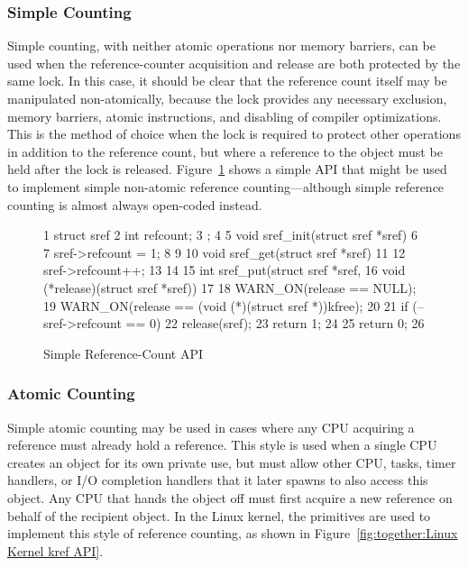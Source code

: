 \subsubsection{Simple Counting}
\label{sec:together:Simple Counting}

Simple counting, with neither atomic operations nor memory barriers,
can be used when the reference-counter acquisition and release are
both protected by the same lock.
In this case, it should be clear that the reference count itself
may be manipulated non-atomically, because the lock provides any
necessary exclusion, memory barriers, atomic instructions, and disabling
of compiler optimizations.
This is the method of choice when the lock is required to protect
other operations in addition to the reference count, but where
a reference to the object must be held after the lock is released.
Figure~\ref{fig:together:Simple Reference-Count API} shows a simple
API that might be used to implement simple non-atomic reference
counting---although simple reference counting is almost always
open-coded instead.

\begin{figure}[tbp]
{ \scriptsize
\begin{verbbox}
  1 struct sref {
  2   int refcount;
  3 };
  4
  5 void sref_init(struct sref *sref)
  6 {
  7   sref->refcount = 1;
  8 }
  9
 10 void sref_get(struct sref *sref)
 11 {
 12   sref->refcount++;
 13 }
 14
 15 int sref_put(struct sref *sref,
 16              void (*release)(struct sref *sref))
 17 {
 18   WARN_ON(release == NULL);
 19   WARN_ON(release == (void (*)(struct sref *))kfree);
 20
 21   if (--sref->refcount == 0) {
 22     release(sref);
 23     return 1;
 24   }
 25   return 0;
 26 }
\end{verbbox}
}
\centering
\theverbbox
\caption{Simple Reference-Count API}
\label{fig:together:Simple Reference-Count API}
\end{figure}

\subsubsection{Atomic Counting}
\label{sec:together:Atomic Counting}

Simple atomic counting may be used in cases where any CPU acquiring
a reference must already hold a reference.
This style is used when a single CPU creates an object for its
own private use, but must allow other CPU, tasks, timer handlers,
or I/O completion handlers that it later spawns to also access this object.
Any CPU that hands the object off must first acquire a new reference
on behalf of the recipient object.
In the Linux kernel, the  primitives are used to implement
this style of reference counting, as shown in
Figure~\ref{fig:together:Linux Kernel kref API}.

